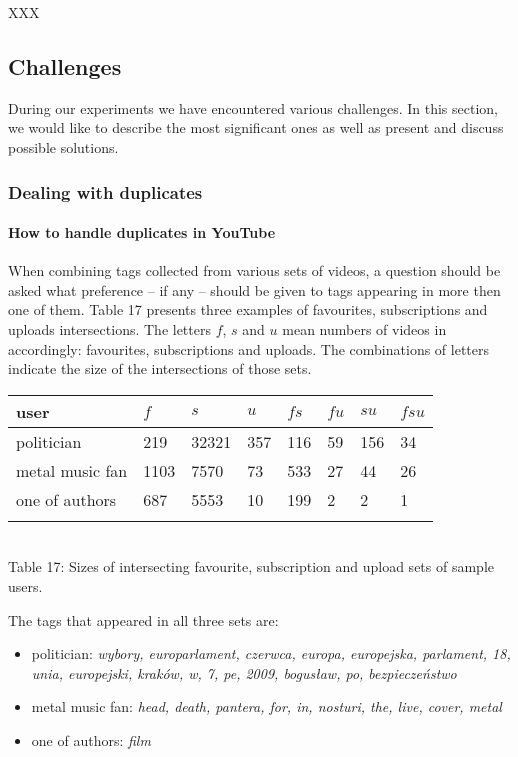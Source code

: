 XXX

\subsection{Challenges}

During our experiments we have encountered various challenges. In this section, we would like to describe
the most significant ones as well as present and discuss possible solutions.

\subsubsection{Dealing with duplicates}

\paragraph{How to handle duplicates in YouTube}

When combining tags collected from various sets of videos, a question should be
asked what preference -- if any -- should be given to tags appearing in more
then one of them. Table 17 presents three examples of favourites,
subscriptions and uploads intersections. The letters $f$, $s$ and $u$ mean
numbers of videos in accordingly: favourites, subscriptions and uploads. The
combinations of letters indicate the size of the intersections of those sets. \\

\begin{center}
\begin{tabular}{| l | l | l | l | l | l | l | l |}
user & $f$ & $s$ & $u$ & $fs$ & $fu$ & $su$ & $fsu$ \\ \hline
politician & 219 & 32321 & 357 & 116 & 59 & 156 & 34 \\
metal music fan & 1103 & 7570 & 73 & 533 & 27 & 44 & 26 \\
one of authors & 687 & 5553 & 10 & 199 & 2 & 2 & 1 \\
\label{intersections}
\end{tabular} \\
Table 17: Sizes of intersecting favourite, subscription and upload sets of sample users. \\
\end{center}

The tags that appeared in all three sets are:
\begin{itemize}
  \item{politician: \emph{wybory, europarlament, czerwca, europa, europejska,
  parlament, 18, unia, europejski, kraków, w, 7, pe, 2009, bogusław, po,
  bezpieczeństwo}}
  \item{metal music fan: \emph{head, death, pantera, for, in, nosturi, the, live, cover, metal}}
  \item{one of authors: \emph{film}}
\end{itemize}

